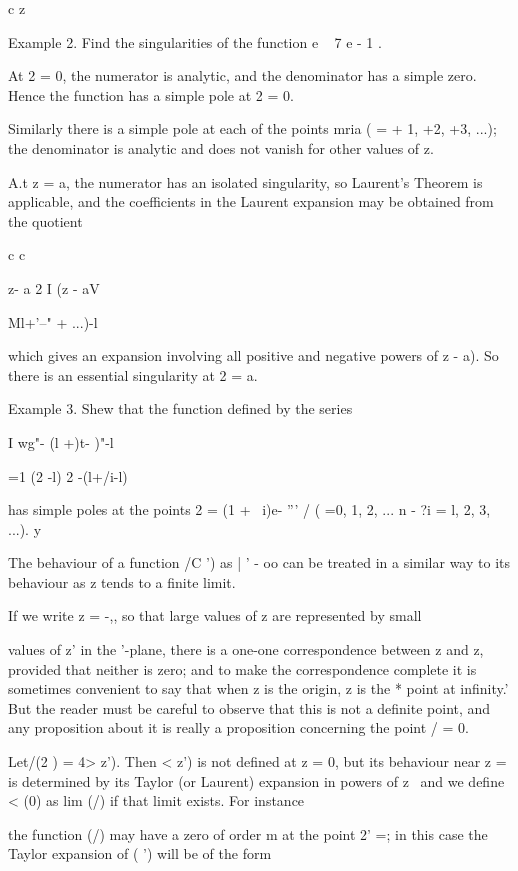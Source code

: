 {{{{%
%

c z\

Example 2. Find the singularities of the function e ~ 7 e - 1 .

At 2 = 0, the numerator is analytic, and the denominator has a simple
zero. Hence the function has a simple pole at 2 = 0.

Similarly there is a simple pole at each of the points mria ( = + 1,
+2, +3, ...); the denominator is analytic and does not vanish for
other values of z.

A.t z = a, the numerator has an isolated singularity, so Laurent's
Theorem is applicable, and the coefficients in the Laurent expansion
may be obtained from the quotient

c c

z- a 2 I (z - aV

Ml+'--" + ...)-l

which gives an expansion involving all positive and negative powers of
z - a). So there is an essential singularity at 2 = a.

Example 3. Shew that the function defined by the series

I wg"- (l +)t- )"-l

 =1 (2 -l) 2 -(l+/i-l)

has simple poles at the points 2 = (1 + ~i)e- ''' / ( =0, 1, 2, ... n
- \; ?i = l, 2, 3, ...). y 


The behaviour of a function /C ') as | ' - oo can be treated in a
similar way to its behaviour as z tends to a finite limit.

If we write z = -,, so that large values of z are represented by small

values of z' in the '-plane, there is a one-one correspondence between
z and z, provided that neither is zero; and to make the
correspondence complete it is sometimes convenient to say that when z
is the origin, z is the * point at infinity.' But the reader must be
careful to observe that this is not a definite point, and any
proposition about it is really a proposition concerning the point / =
0.

Let/(2 ) = 4> z'). Then < z') is not defined at z = 0, but its
behaviour near z = is determined by its Taylor (or Laurent) expansion
in powers of z \ and we define < (0) as lim (/) if that limit exists.
For instance

the function (/) may have a zero of order m at the point 2' =; in
this case the Taylor expansion of ( ') will be of the form

}}}}
